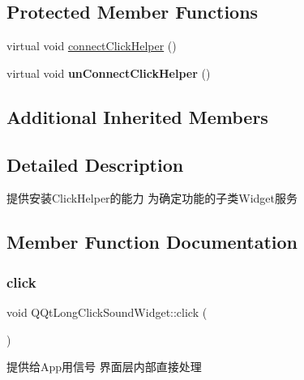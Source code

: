 \subsection*{Protected Member Functions}
\begin{DoxyCompactItemize}
\item 
virtual void \mbox{\hyperlink{class_q_qt_long_click_sound_widget_a2fe9da353776d801101f849a1c8f5b51}{connect\+Click\+Helper}} ()
\item 
\mbox{\label{class_q_qt_long_click_sound_widget_a846c90c5b5497ff7480084d54cf9106e}} 
virtual void {\bfseries un\+Connect\+Click\+Helper} ()
\end{DoxyCompactItemize}
\subsection*{Additional Inherited Members}


\subsection{Detailed Description}
提供安装\+Click\+Helper的能力 为确定功能的子类\+Widget服务 

\subsection{Member Function Documentation}
\mbox{\label{class_q_qt_long_click_sound_widget_ae5db4379ed4838b78afab35a825af0a3}} 
\subsubsection{\texorpdfstring{click}{click}}
{\footnotesize\ttfamily void Q\+Qt\+Long\+Click\+Sound\+Widget\+::click (\begin{DoxyParamCaption}{ }\end{DoxyParamCaption})\hspace{0.3cm}{\ttfamily [signal]}}

提供给\+App用信号 界面层内部直接处理 \mbox{\label{class_q_qt_long_click_sound_widget_a2fe9da353776d801101f849a1c8f5b51}} 
